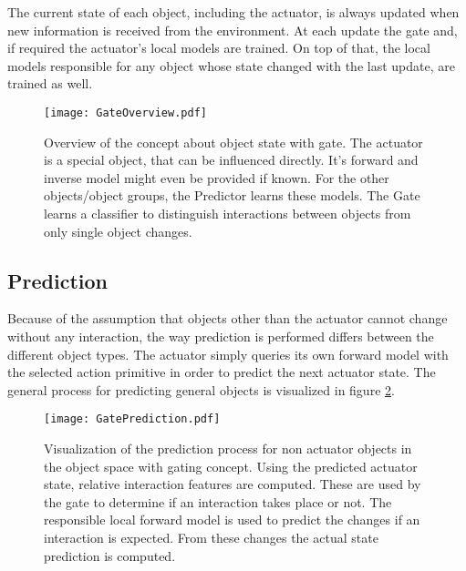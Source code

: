 The current state of each object, including the actuator, is always updated when new information is received from the environment. At each update the gate and, if required the actuator's local models are trained. On top of that, the local models responsible for any object whose state changed with the last update, are trained as well.


\begin{figure}
	\centering
	\texttt{[image: GateOverview.pdf]}
	\caption{Overview of the concept about object state with gate. The actuator is a special object, that can be influenced directly. It's forward and inverse model might even be provided if known. For the other objects/object groups, the Predictor learns these models. The Gate learns a classifier to distinguish interactions between objects from only single object changes.} 
	\label{fig:GateOverview}
\end{figure}

\subsection{Prediction}

Because of the assumption that objects other than the actuator cannot change without any interaction, the way prediction is performed differs between the different object types. The actuator simply queries its own forward model with the selected action primitive in order to predict the next actuator state. 
The general process for predicting general objects is visualized in figure \ref{fig:GatePrediction}.

\begin{figure}
	\centering
	\texttt{[image: GatePrediction.pdf]}
	\caption{Visualization of the prediction process for non actuator objects in the object space with gating concept. Using the predicted actuator state, relative interaction features are computed. These are used by the gate to determine if an interaction takes place or not. The responsible local forward model is used to predict the changes if an interaction is expected. From these changes the actual state prediction is computed.} 
	\label{fig:GatePrediction}
\end{figure}

